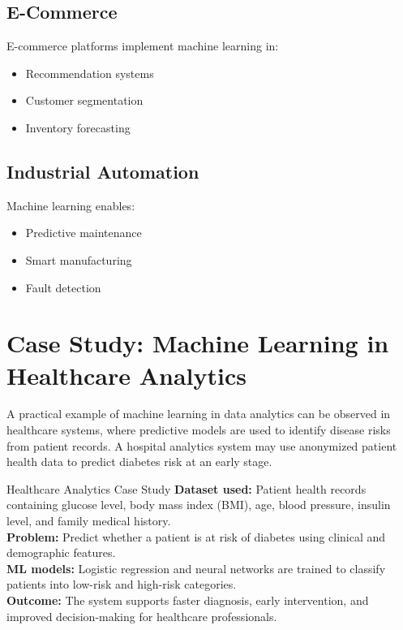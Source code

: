 \documentclass[11pt,a4paper]{article}
\begin{document}
\subsection{E-Commerce}

E-commerce platforms implement machine learning in:
\begin{itemize}
    \item Recommendation systems
    \item Customer segmentation
    \item Inventory forecasting
\end{itemize}

\subsection{Industrial Automation}

Machine learning enables:
\begin{itemize}
    \item Predictive maintenance
    \item Smart manufacturing
    \item Fault detection
\end{itemize}


\section{Case Study: Machine Learning in Healthcare Analytics}

A practical example of machine learning in data analytics can be observed in healthcare systems, where predictive models are used to identify disease risks from patient records. A hospital analytics system may use anonymized patient health data to predict diabetes risk at an early stage.

\begin{summarybox}{Healthcare Analytics Case Study}
\textbf{Dataset used:} Patient health records containing glucose level, body mass index (BMI), age, blood pressure, insulin level, and family medical history.\\[1mm]
\textbf{Problem:} Predict whether a patient is at risk of diabetes using clinical and demographic features.\\[1mm]
\textbf{ML models:} Logistic regression and neural networks are trained to classify patients into low-risk and high-risk categories.\\[1mm]
\textbf{Outcome:} The system supports faster diagnosis, early intervention, and improved decision-making for healthcare professionals.
\end{summarybox}
\end{document}
